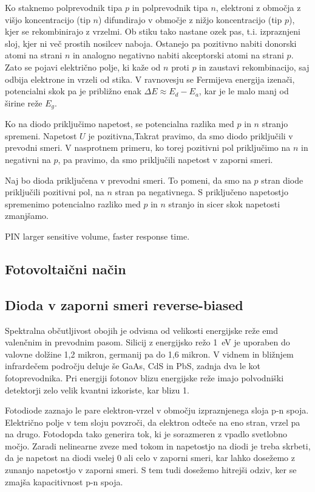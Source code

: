 Ko staknemo polprevodnik tipa $p$ in polprevodnik tipa $n$, elektroni 
z območja z višjo koncentracijo (tip $n$) difundirajo v območje z nižjo koncentracijo
(tip $p$), kjer se rekombinirajo z vrzelmi. 
Ob stiku tako nastane ozek pas,  t.i. izpraznjeni sloj, kjer ni več 
prostih nosilcev naboja. Ostanejo pa pozitivno nabiti donorski atomi na strani $n$
in analogno negativno nabiti akceptorski atomi na strani $p$. Zato se pojavi 
električno polje, ki kaže od $n$ proti $p$ in zaustavi rekombinacijo, saj odbija
elektrone in vrzeli od stika. V ravnovesju se Fermijeva energija izenači, potencialni
skok pa je približno enak $\Delta E \approx E_d-E_a$, kar je le malo manj od 
širine reže $E_g$.

Ko na diodo priključimo napetost, se potencialna razlika med $p$ in $n$ stranjo 
spremeni. Napetost $U$ je pozitivna,Takrat pravimo, da smo diodo priključili v prevodni smeri. 
V nasprotnem primeru, ko torej pozitivni pol priključimo na $n$ in negativni na $p$, 
pa pravimo, da smo priključili napetost v zaporni smeri. 

Naj bo dioda priključena v prevodni smeri. To pomeni, da smo na $p$ stran diode priključili
pozitivni pol, na $n$ stran pa negativnega. S priključeno napetostjo spremenimo
potencialno razliko med $p$ in $n$ stranjo in sicer skok napetosti zmanjšamo. 


PIN larger sensitive volume, faster response time. 

\subsection*{Fotovoltaični način}

\subsection*{Dioda v zaporni smeri reverse-biased}



Spektralna občutljivost
obojih je odvisna od velikosti energijske reže emd valenčnim in prevodnim pasom. Silicij
z energijsko režo 1~eV je uporaben do valovne dolžine 1,2 mikron, germanij pa do 1,6 mikron.
V vidnem in bližnjem infrardečem področju deluje še GaAs, CdS in PbS, zadnja dva le kot
fotoprevodnika. Pri energiji fotonov blizu energijske reže 
imajo polvodniški detektorji zelo velik kvantni izkoriste, kar blizu 1.

Fotodiode zaznajo le pare elektron-vrzel v območju izpraznjenega sloja p-n spoja. Električno 
polje v tem sloju povzroči, da elektron odteče na eno stran, vrzel pa na drugo. Fotodopda tako
generira tok, ki je sorazmeren z vpadlo svetlobno močjo. Zaradi nelinearne zveze med tokom in napetostjo
na diodi je treba skrbeti, da je napetost na diodi vselej 0 ali celo v zaporni smeri, kar lahko
dosežemo z zunanjo napetostjo v zaporni smeri. S tem tudi dosežemo hitrejši odziv, ker 
se zmajša kapacitivnost p-n spoja. 

